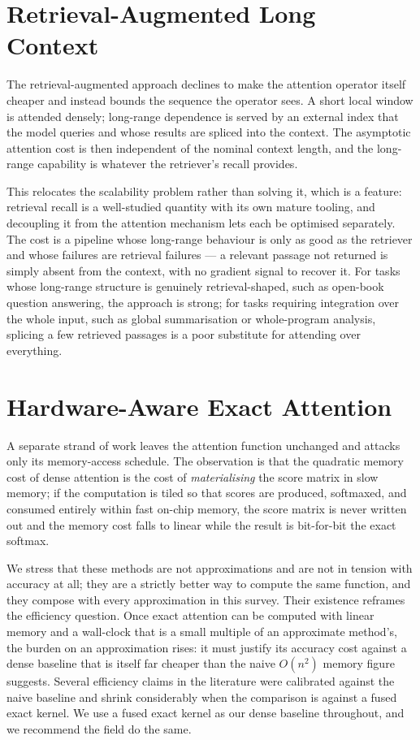 \documentclass[11pt]{article}
\begin{document}
\section{Retrieval-Augmented Long Context}
\label{sec:retrieval}

The retrieval-augmented approach declines to make the attention operator itself cheaper and instead bounds the sequence the operator sees. A short local window is attended densely; long-range dependence is served by an external index that the model queries and whose results are spliced into the context. The asymptotic attention cost is then independent of the nominal context length, and the long-range capability is whatever the retriever's recall provides.

This relocates the scalability problem rather than solving it, which is a feature: retrieval recall is a well-studied quantity with its own mature tooling, and decoupling it from the attention mechanism lets each be optimised separately. The cost is a pipeline whose long-range behaviour is only as good as the retriever and whose failures are retrieval failures --- a relevant passage not returned is simply absent from the context, with no gradient signal to recover it. For tasks whose long-range structure is genuinely retrieval-shaped, such as open-book question answering, the approach is strong; for tasks requiring integration over the whole input, such as global summarisation or whole-program analysis, splicing a few retrieved passages is a poor substitute for attending over everything.

\section{Hardware-Aware Exact Attention}
\label{sec:hardware}

A separate strand of work leaves the attention function unchanged and attacks only its memory-access schedule. The observation is that the quadratic memory cost of dense attention is the cost of \emph{materialising} the score matrix in slow memory; if the computation is tiled so that scores are produced, softmaxed, and consumed entirely within fast on-chip memory, the score matrix is never written out and the memory cost falls to linear while the result is bit-for-bit the exact softmax.

We stress that these methods are not approximations and are not in tension with accuracy at all; they are a strictly better way to compute the same function, and they compose with every approximation in this survey. Their existence reframes the efficiency question. Once exact attention can be computed with linear memory and a wall-clock that is a small multiple of an approximate method's, the burden on an approximation rises: it must justify its accuracy cost against a dense baseline that is itself far cheaper than the naive $O(n^2)$ memory figure suggests. Several efficiency claims in the literature were calibrated against the naive baseline and shrink considerably when the comparison is against a fused exact kernel. We use a fused exact kernel as our dense baseline throughout, and we recommend the field do the same.
\end{document}
